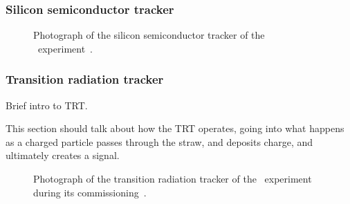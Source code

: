 
\FloatBarrier
\subsubsection{Silicon semiconductor tracker} 

\begin{figure}[ht]
  \caption{
    Photograph of the silicon semiconductor tracker of the
    \atlas\ experiment~\cite{Maximilien:883305}.
  }
  \label{fig:sct_photo}
\end{figure}


\FloatBarrier
\subsubsection{Transition radiation tracker} 

{\color{red} Brief intro to TRT. }

{\color{red}This section should talk about how the TRT operates, going into
  what happens as a charged particle passes through the straw, and deposits
  charge, and ultimately creates a signal.
}


\begin{figure}[ht]
  \caption{
    Photograph of the transition radiation tracker of the
    \atlas\ experiment during its commissioning~\cite{Maximilien:889555}.
  }
  \label{fig:trt_module}
\end{figure}

